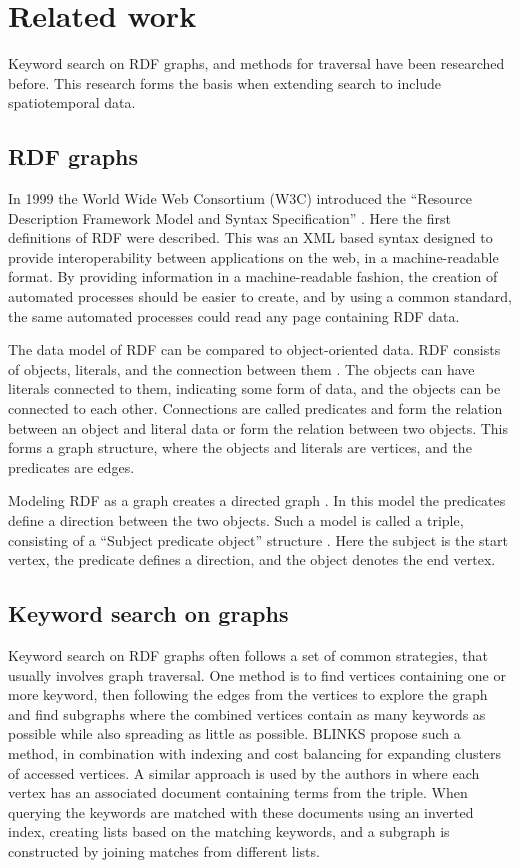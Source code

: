 \chapter{Related work}
\label{cha:related_work}
Keyword search on RDF graphs, and methods for traversal have been researched before. This research forms the basis when extending search to include spatiotemporal data.

\section{RDF graphs}
In 1999 the World Wide Web Consortium (W3C) introduced the ``Resource Description Framework Model and Syntax Specification'' \cite{brickley1999resource}. Here the first definitions of RDF were described. This was an XML based syntax designed to provide interoperability between applications on the web, in a machine-readable format. By providing information in a machine-readable fashion, the creation of automated processes should be easier to create, and by using a common standard, the same automated processes could read any page containing RDF data.

The data model of RDF can be compared to object-oriented data. RDF consists of objects, literals, and the connection between them \cite{decker2000framework}. The objects can have literals connected to them, indicating some form of data, and the objects can be connected to each other. Connections are called predicates and form the relation between an object and literal data or form the relation between two objects. This forms a graph structure, where the objects and literals are vertices, and the predicates are edges.

Modeling RDF as a graph creates a directed graph \cite{mcbride2002jena}. In this model the predicates define a direction between the two objects. Such a model is called a triple, consisting of a ``Subject predicate object'' structure \cite{decker2000framework}. Here the subject is the start vertex, the predicate defines a direction, and the object denotes the end vertex.

\section{Keyword search on graphs}
Keyword search on RDF graphs often follows a set of common strategies, that usually involves graph traversal. One method is to find vertices containing one or more keyword, then following the edges from the vertices to explore the graph and find subgraphs where the combined vertices contain as many keywords as possible while also spreading as little as possible. BLINKS \cite{blinks} propose such a method, in combination with indexing and cost balancing for expanding clusters of accessed vertices. A similar approach is used by the authors in \cite{Elbassuoni:2011:KSO:2063576.2063615} where each vertex has an associated document containing terms from the triple. When querying the keywords are matched with these documents using an inverted index, creating lists based on the matching keywords, and a subgraph is constructed by joining matches from different lists.

